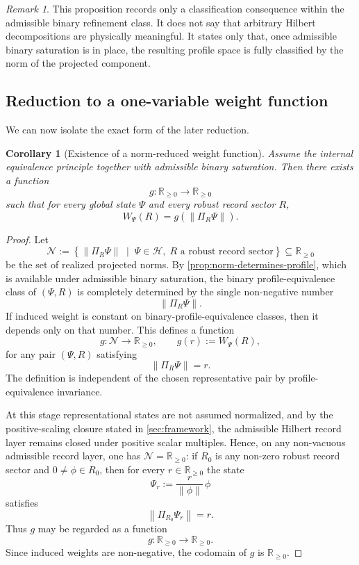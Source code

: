 \documentclass[11pt]{article}
\newtheorem{corollary}{Corollary}
\theoremstyle{remark}
\newtheorem{remark}{Remark}
\numberwithin{equation}{section}
\newcommand{\RR}{\mathbb{R}}
\newcommand{\HH}{\mathcal{H}}
\newcommand{\Wpsi}[1]{W_{\Psi}\!\left(#1\right)}
\newcommand{\Proj}[1]{\Pi_{#1}}
\newcommand{\norm}[1]{\left\lVert #1 \right\rVert}
\begin{document}
\begin{remark}
This proposition records only a classification consequence within the
admissible binary refinement class. It does not say that arbitrary
Hilbert decompositions are physically meaningful. It states only that,
once admissible binary saturation is in place, the resulting profile
space is fully classified by the norm of the projected component.
\end{remark}

\subsection{Reduction to a one-variable weight function}

We can now isolate the exact form of the later reduction.

\begin{corollary}[Existence of a norm-reduced weight function]
\label{cor:norm-reduced-weight}
Assume the internal equivalence principle together with admissible binary saturation. Then there exists a function
\[
g : \RR_{\geq 0} \to \RR_{\geq 0}
\]
such that for every global state $\Psi$ and every robust record sector $R$,
\[
\Wpsi{R} = g\!\left(\norm{\Proj{R}\Psi}\right).
\]
\end{corollary}

\begin{proof}
Let
\[
\mathcal{N}
:=
\left\{
\norm{\Proj{R}\Psi}
\;\middle|\;
\Psi \in \HH,\;
R \text{ a robust record sector}
\right\}
\subseteq \RR_{\geq 0}
\]
be the set of realized projected norms. By \cref{prop:norm-determines-profile}, which is available under admissible binary saturation, the binary profile-equivalence class of $(\Psi,R)$ is completely determined by the single non-negative number
\[
\norm{\Proj{R}\Psi}.
\]
If induced weight is constant on binary-profile-equivalence classes, then it depends only on that number. This defines a function
\[
g : \mathcal{N} \to \RR_{\geq 0},
\qquad
g(r) := \Wpsi{R},
\]
for any pair $(\Psi,R)$ satisfying
\[
\norm{\Proj{R}\Psi} = r.
\]
The definition is independent of the chosen representative pair by profile-equivalence invariance.

At this stage representational states are not assumed normalized, and by the positive-scaling closure stated in \cref{sec:framework}, the admissible Hilbert record layer remains closed under positive scalar multiples. Hence, on any non-vacuous admissible record layer, one has \(\mathcal{N}=\RR_{\geq 0}\): if \(R_0\) is any non-zero robust record sector and \(0 \neq \phi \in R_0\), then for every \(r \in \RR_{\geq 0}\) the state
\[
\Psi_r := \frac{r}{\norm{\phi}}\,\phi
\]
satisfies
\[
\norm{\Proj{R_0}\Psi_r} = r.
\]
Thus \(g\) may be regarded as a function
\[
g : \RR_{\geq 0} \to \RR_{\geq 0}.
\]
Since induced weights are non-negative, the codomain of \(g\) is \(\RR_{\geq 0}\).
\end{proof}
\end{document}
